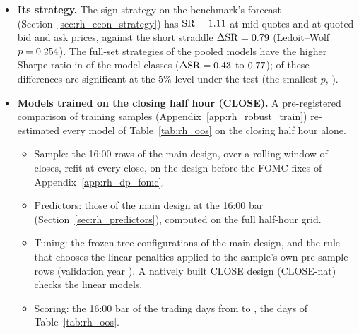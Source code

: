 \begin{itemize}
\begin{itemize}
    \rhciQNewClose, against \rhciQOldClose{} before the rebuild ($\DM = \rhciDmOldNewClose$,
    \rhciPOldNewClose), and its sign strategy takes the other position on \rhciFlipDays{} of the \rheSzDays{}
    post-warmup days.
  \end{itemize}
\item \textbf{Its strategy.} The sign strategy on the benchmark's forecast (Section~\ref{sec:rh_econ_strategy}) has
  $\mathrm{SR} = 1.11$ at mid-quotes and \rhemShXCiHar{} at quoted bid and ask prices, against the short straddle
  $\Delta\mathrm{SR} = 0.79$ (Ledoit--Wolf $p = 0.254$). The full-set strategies of the
  pooled models have the higher Sharpe ratio in \rhemFullVsCiHarPos{} of the \rhorAfPairs{} model classes
  ($\Delta\mathrm{SR} = 0.43$ to $0.77$); \rhemFullVsCiHarSig{} of these differences are
  significant at the 5\% level under the \citet{LedoitWolf2008} test (the smallest $p$, \rhemFullVsCiHarPMin).
\item \textbf{Models trained on the closing half hour (CLOSE).} A pre-registered comparison of training samples
  (Appendix~\ref{app:rh_robust_train}) re-estimated every model of Table~\ref{tab:rh_oos} on the closing half
  hour alone.
  \begin{itemize}
  \item Sample: the 16:00 rows of the main design, over a rolling window of \rhtaRowsCl{} closes, refit at every
    close, on the design before the FOMC fixes of Appendix~\ref{app:rh_dp_fomc}.
  \item Predictors: those of the main design at the 16:00 bar (Section~\ref{sec:rh_predictors}), computed on the full
    half-hour grid.
  \item Tuning: the frozen tree configurations of the main design, and the rule that chooses the linear penalties
    applied to the sample's own pre-sample rows (validation year \rhtaValYear). A natively built CLOSE design
    (CLOSE-nat) checks the linear models.
  \item Scoring: the 16:00 bar of the \rhtaNdays{} trading days from \rhtaStart{} to \rhtaEnd, the days of
    Table~\ref{tab:rh_oos}.
  \end{itemize}
\end{itemize}

